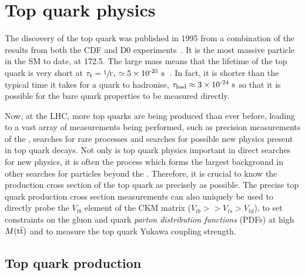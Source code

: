 




\section{Top quark physics} %
\label{sec:top_quark_physics}

The discovery of the top quark was published in 1995 from a combination of the results from both the CDF and D0 experiments~\cite{Th:TopCDF,Th:TopD0}.
It is the most massive particle in the SM to date, at 172.5\GeV{}.
The large mass means that the lifetime of the top quark is very short at $\tau_{\mathrm{t}} = \sfrac{1}{\Gamma_{\mathrm{t}}} \simeq 5\times \text{10}^\text{-25}\mathrm{~s}^{}$~\cite{PDG}.
In fact, it is shorter than the typical time it takes for a quark to hadronise, $\tau_{\mathrm{had}} \approx 3\times \text{10}^\text{-24}\mathrm{~s}^{}$ so that it is possible for the bare quark properties to be measured directly.

Now, at the LHC, more top quarks are being produced than ever before, leading to a vast array of measurements being performed, such as precision measurements of the \SM{}, searches for rare \SM{} processes and searches for possible new physics present in top quark decays.
Not only is top quark physics important in direct searches for new physics, it is often the process which forms the largest background in other searches for particles beyond the \SM{}.
Therefore, it is crucial to know the production cross section of the top quark as precisely as possible.
The precise top quark production cross section measurements can also uniquely be used to directly probe the $V_{tb}$ element of the CKM matrix ($V_{tb} >> V_{ts} > V_{td}$), to set constraints on the gluon and quark \textit{parton distribution functions} (PDFs) at high $M(\mathrm{t}\overline{\mathrm{t}})$ and to measure the top quark Yukawa coupling strength.

\subsection{Top quark production} %
\label{sub:top_quark_production}

